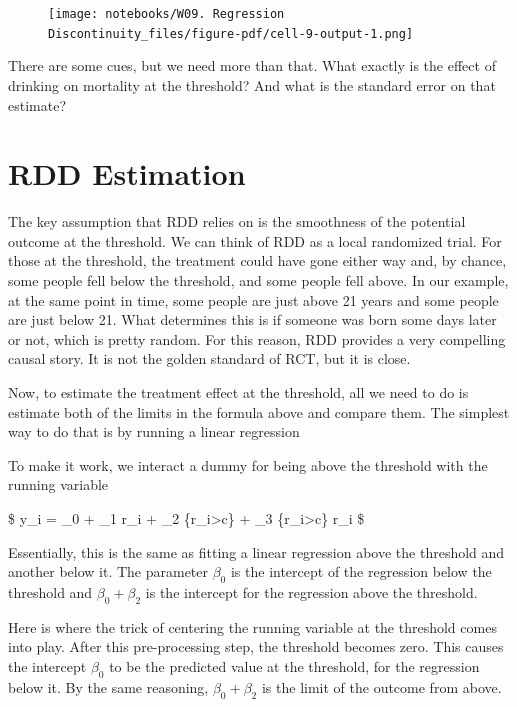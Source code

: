 \documentclass[
  letterpaper,
  DIV=11,
  numbers=noendperiod]{scrreprt}
\begin{document}
\begin{figure}[H]

{\centering \texttt{[image: notebooks/W09. Regression Discontinuity\_files/figure-pdf/cell-9-output-1.png]}

}

\end{figure}

There are some cues, but we need more than that. What exactly is the
effect of drinking on mortality at the threshold? And what is the
standard error on that estimate?

\hypertarget{rdd-estimation}{%
\section{RDD Estimation}\label{rdd-estimation}}

The key assumption that RDD relies on is the smoothness of the potential
outcome at the threshold. We can think of RDD as a local randomized
trial. For those at the threshold, the treatment could have gone either
way and, by chance, some people fell below the threshold, and some
people fell above. In our example, at the same point in time, some
people are just above 21 years and some people are just below 21. What
determines this is if someone was born some days later or not, which is
pretty random. For this reason, RDD provides a very compelling causal
story. It is not the golden standard of RCT, but it is close.

Now, to estimate the treatment effect at the threshold, all we need to
do is estimate both of the limits in the formula above and compare them.
The simplest way to do that is by running a linear regression

To make it work, we interact a dummy for being above the threshold with
the running variable

\$ y\_i = \beta\_0 + \beta\_1 r\_i + \beta\_2
\{r\_i\textgreater c\} + \beta\_3
\{r\_i\textgreater c\} r\_i \$

Essentially, this is the same as fitting a linear regression above the
threshold and another below it. The parameter \(\beta_0\) is the
intercept of the regression below the threshold and \(\beta_0+\beta_2\)
is the intercept for the regression above the threshold.

Here is where the trick of centering the running variable at the
threshold comes into play. After this pre-processing step, the threshold
becomes zero. This causes the intercept \(\beta_0\) to be the predicted
value at the threshold, for the regression below it. By the same
reasoning, \(\beta_0+\beta_2\) is the limit of the outcome from above.
\end{document}

